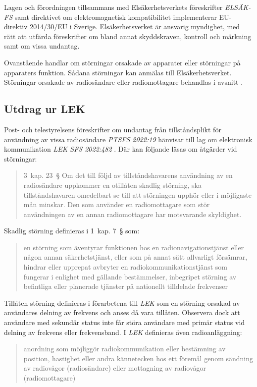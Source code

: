 Lagen och förordningen tillsammans med Elsäkerhetsverkets föreskrifter
\emph{ELSÄK-FS} samt direktivet om elektromagnetisk kompatibilitet implementerar
EU-direktiv 2014/30/EU i Sverige.
Elsäkerhetsverket är ansvarig myndighet, med rätt att utfärda föreskrifter om
bland annat skyddskraven, kontroll och märkning samt om vissa undantag.

Ovanstående handlar om störningar orsakade av apparater eller störningar på
apparaters funktion.
Sådana störningar kan anmälas till Elsäkerhetsverket.
Störningar orsakade av radiosändare eller radiomottagare behandlas i avsnitt
.

\newpage
\subsection{Utdrag ur LEK}
\label{LEK}

Post- och telestyrelsens föreskrifter om undantag från tillståndsplikt för
användning av vissa radiosändare \emph{PTSFS 2022:19} \cite{PTSFS2022:19}
hänvisar till lag om elektronisk kommunikation \emph{LEK} \emph{SFS 2022:482}
\cite{SFS2022:482}.
Där kan följande läsas om åtgärder vid störningar:
\begin{quote}
	3~kap. 23~\S{} Om det till följd av tillståndshavarens användning av en
	radiosändare uppkommer en otillåten skadlig störning, ska tillståndshavaren
	omedelbart se till att störningen upphör eller i möjligaste mån minskar.
	Den som använder en radiomottagare som stör användningen av en annan
	radiomottagare har motsvarande skyldighet.
\end{quote}
Skadlig störning definieras i 1~kap. 7~\S{} som:
\begin{quote}
	en störning som äventyrar funktionen hos en radionavigationstjänst eller
	någon annan säkerhetstjänst, eller som på annat sätt allvarligt försämrar,
	hindrar eller upprepat avbryter en radiokommunikationstjänst som fungerar i
	enlighet med gällande bestämmelser, inbegripet störning av befintliga eller
	planerade tjänster på nationellt tilldelade frekvenser
\end{quote}
Tillåten störning definieras i förarbetena till \emph{LEK} som en störning
orsakad av användares delning av frekvens och anses då vara tillåten.
Observera dock att användare med sekundär status inte får störa användare med
primär status vid delning av frekvens eller frekvensband.
I \emph{LEK} definieras även radioanläggning:
\begin{quote}
	anordning som möjliggör radiokommunikation eller bestämning av position,
	hastighet eller andra kännetecken hos ett föremål genom sändning av radiovågor
	(radiosändare) eller mottagning av radiovågor (radiomottagare)
\end{quote}

